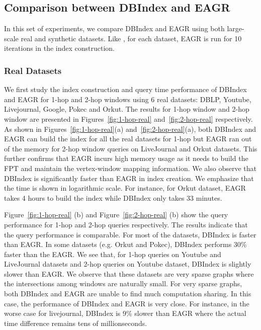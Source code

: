 \subsection{Comparison between DBIndex and EAGR}

In this set of experiments, we compare DBIndex and 
EAGR \cite{mondal2014eagr} using both large-scale real 
and synthetic datasets. Like \cite{mondal2014eagr},
for each dataset, EAGR is run for 10 
iterations in the index construction.

\subsubsection{Real Datasets} 
We first study the index construction and 
query time performance of DBIndex and EAGR for 1-hop and 2-hop windows 
using 6 real datasets: DBLP, Youtube, Livejournal, Google, Pokec and Orkut. 
The results for 1-hop window and 2-hop window are presented
in Figures~\ref{fig:1-hop-real} and~\ref{fig:2-hop-real} 
respectively. 
As shown in Figures~\ref{fig:1-hop-real}(a) and~\ref{fig:2-hop-real}(a), both DBIndex and EAGR can build the index for all
the real datasets for 1-hop but EAGR ran out of the memory for 2-hop window queries on LiveJournal and Orkut datasets. This further confirms that EAGR incurs 
high memory usage as it needs to build the FPT and 
maintain the vertex-window mapping information. We also observe that 
DBIndex is significantly faster than EAGR in index creation. 
We emphasize that the time is shown in logarithmic scale. 
For instance, for Orkut dataset, EAGR takes 4 hours to build the index 
while DBIndex only takes 33 minutes. 

Figure~\ref{fig:1-hop-real} (b) and Figure~\ref{fig:2-hop-real} (b) 
show the query performance for 1-hop and 2-hop queries respectively. 
The results indicate that the query performance is comparable. 
For most of the datasets, DBIndex is faster than EAGR.
In some datasets (e.g. Orkut and Pokec), DBIndex performs 30\% faster than the EAGR. 
We see that, for 1-hop queries on 
Youtube and LiveJournal datasets and 2-hop queries on Youtube dataset, DBIndex is slightly slower than EAGR. We observe 
that these datasets are very sparse graphs where the intersections among windows are naturally small. For very sparse graphs, 
both DBIndex and EAGR are unable to find much computation sharing. In this case, the performance of DBIndex and EAGR is very close. For instance, in the worse case for livejournal, DBIndex is 9\% slower than EAGR where the actual time difference remains tens of millionseconds.    
 
